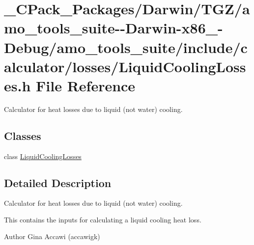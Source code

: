 \hypertarget{___c_pack___packages_2_darwin_2_t_g_z_2amo__tools__suite--_darwin-x86__64-_debug_2amo__tools__su63d1ef91d6529ade7ea7f41223ace5a4}{}\section{\+\_\+\+C\+Pack\+\_\+\+Packages/\+Darwin/\+T\+G\+Z/amo\+\_\+tools\+\_\+suite-\/-\/\+Darwin-\/x86\+\_-\/\+Debug/amo\+\_\+tools\+\_\+suite/include/calculator/losses/\+Liquid\+Cooling\+Losses.h File Reference}
\label{___c_pack___packages_2_darwin_2_t_g_z_2amo__tools__suite--_darwin-x86__64-_debug_2amo__tools__su63d1ef91d6529ade7ea7f41223ace5a4}


Calculator for heat losses due to liquid (not water) cooling.  


\subsection*{Classes}
\begin{DoxyCompactItemize}
\item 
class \hyperlink{class_liquid_cooling_losses}{Liquid\+Cooling\+Losses}
\end{DoxyCompactItemize}


\subsection{Detailed Description}
Calculator for heat losses due to liquid (not water) cooling. 

This contains the inputs for calculating a liquid cooling heat loss.

\begin{DoxyAuthor}{Author}
Gina Accawi (accawigk) 
\end{DoxyAuthor}

